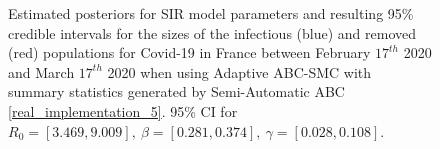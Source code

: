 \documentclass[11pt,a4paper]{article}
\theoremstyle{break}
\begin{document}
  \begin{figure}[H]
    \centering
    \caption{Estimated posteriors for SIR model parameters and resulting 95\% credible intervals for the sizes of the infectious (blue) and removed (red) populations for Covid-19 in France between February $17^{th}$ 2020 and March $17^{th}$ 2020 when using Adaptive ABC-SMC with summary statistics generated by Semi-Automatic ABC \ref{real_implementation_5}. 95\% CI for $R_0=[3.469,9.009],\ \beta=[0.281,0.374],\ \gamma=[0.028,0.108]$.}
    \label{fig_france_semi_auto}
  \end{figure}
\end{document}
